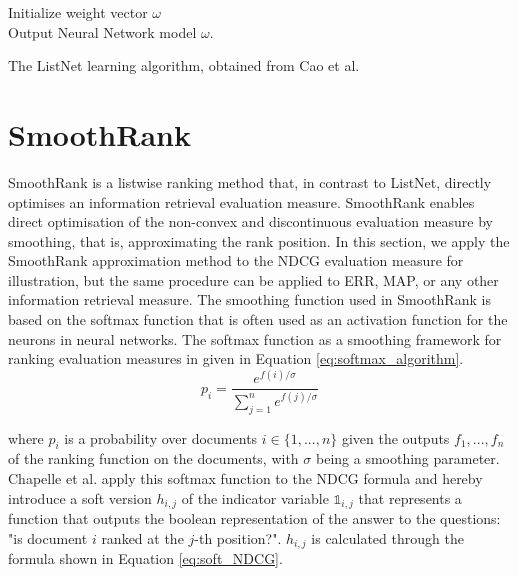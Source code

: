 \LinesNumbered
\begin{algorithm}[H]
 Initialize weight vector $\omega$\\
 Output Neural Network model $\omega$.
 \caption{The ListNet learning algorithm, obtained from Cao et al. \cite{Cao2007}}
 \label{alg:listnet}
\end{algorithm}

\section{SmoothRank}
SmoothRank \cite{Chapelle2010} is a listwise ranking method that, in contrast to ListNet, directly optimises an information retrieval evaluation measure. SmoothRank enables direct optimisation of the non-convex and discontinuous evaluation measure by smoothing, that is, approximating the rank position. In this section, we apply the SmoothRank approximation method to the \ac{NDCG} evaluation measure for illustration, but the same procedure can be applied to \ac{ERR}, \ac{MAP}, or any other information retrieval measure. The smoothing function used in SmoothRank is based on the softmax function \cite{Bridle1990} that is often used as an activation function for the neurons in neural networks. The softmax function as a smoothing framework for ranking evaluation measures in given in Equation \ref{eq:softmax_algorithm}.
\begin{equation}
p_i = \frac{e^{f(i)/\sigma}}{\sum\nolimits_{j=1}^{n}e^{f(j)/\sigma}}
\label{eq:softmax_algorithm}
\end{equation}

where $p_i$ is a probability over documents $i \in \{1,...,n\}$ given the outputs $f_1,...,f_n$ of the ranking function on the documents, with $\sigma$ being a smoothing parameter. Chapelle et al. \cite{Chapelle2010} apply this softmax function to the \ac{NDCG} formula and hereby introduce a soft version $h_{i,j}$ of the indicator variable $\mathbb{1}_{i,j}$ that represents a function that outputs the boolean representation of the answer to the questions: "is document $i$ ranked at the $j$-th position?". $h_{i,j}$ is calculated through the formula shown in Equation \ref{eq:soft_NDCG}.

